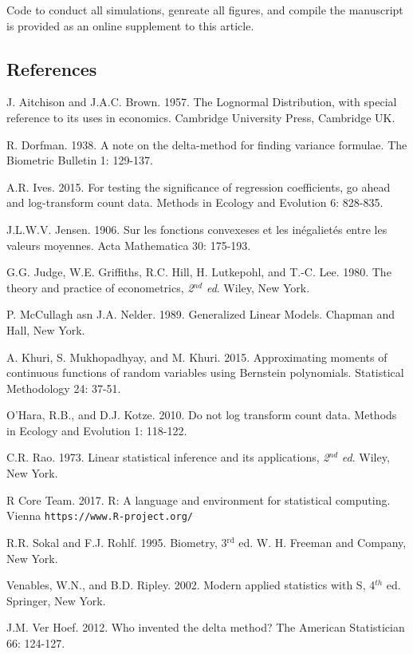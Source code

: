 \documentclass[]{article}
\begin{document}
Code to conduct all simulations, genreate all figures, and compile the
manuscript is provided as an online supplement to this article.

\subsection{References}\label{references}

J. Aitchison and J.A.C. Brown. 1957. The Lognormal Distribution, with
special reference to its uses in economics. Cambridge University Press,
Cambridge UK.

R. Dorfman. 1938. A note on the delta-method for finding variance
formulae. The Biometric Bulletin 1: 129-137.

A.R. Ives. 2015. For testing the significance of regression
coefficients, go ahead and log-transform count data. Methods in Ecology
and Evolution 6: 828-835.

J.L.W.V. Jensen. 1906. Sur les fonctions convexeses et les inégalietés
entre les valeurs moyennes. Acta Mathematica 30: 175-193.

G.G. Judge, W.E. Griffiths, R.C. Hill, H. Lutkepohl, and T.-C. Lee.
1980. The theory and practice of econometrics, \textit{2}\(^{nd}\)
\textit{ed}. Wiley, New York.

P. McCullagh asn J.A. Nelder. 1989. Generalized Linear Models. Chapman
and Hall, New York.

A. Khuri, S. Mukhopadhyay, and M. Khuri. 2015. Approximating moments of
continuous functions of random variables using Bernstein polynomials.
Statistical Methodology 24: 37-51.

O'Hara, R.B., and D.J. Kotze. 2010. Do not log transform count data.
Methods in Ecology and Evolution 1: 118-122.

C.R. Rao. 1973. Linear statistical inference and its applications,
\textit{2}\(^{nd}\) \textit{ed}. Wiley, New York.

R Core Team. 2017. R: A language and environment for statistical
computing. Vienna \texttt{https://www.R-project.org/}

R.R. Sokal and F.J. Rohlf. 1995. Biometry, 3\(^{\text{rd}}\) ed. W. H.
Freeman and Company, New York.

Venables, W.N., and B.D. Ripley. 2002. Modern applied statistics with S,
4\(^{th}\) ed. Springer, New York.

J.M. Ver Hoef. 2012. Who invented the delta method? The American
Statistician 66: 124-127.

\clearpage
\end{document}
